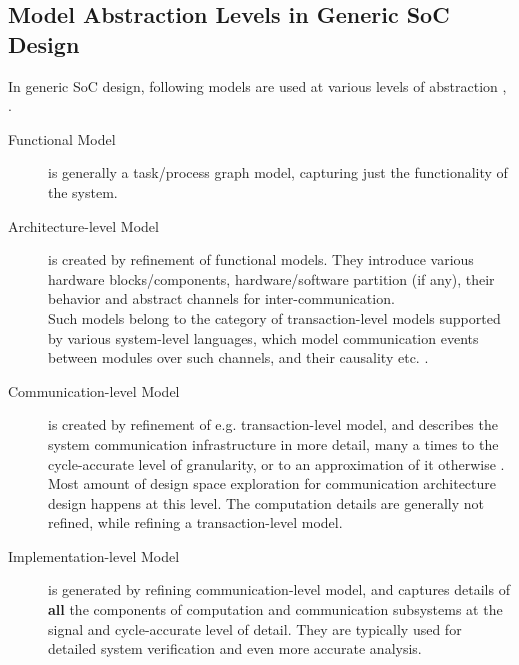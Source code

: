 \documentclass[12pt]{article}
\begin{document}
\subsection{Model Abstraction Levels in Generic SoC Design}
In generic SoC design, following models are used at various levels of
abstraction \cite{ocn_book}, \cite{comm_soc}.
\begin{description}
\item[Functional Model] is generally a task/process graph model, capturing
just the functionality of the system. 
\item[Architecture-level Model] is created by refinement of functional
models. They introduce various hardware blocks/components,
hardware/software partition (if any), their behavior and abstract channels
for inter-communication. \\
Such models belong to the category of
transaction-level models supported by various system-level
languages, which model communication events between modules over such
channels, and their causality etc. \cite{gajski_tlm_pap}.
\item[Communication-level Model] is created by refinement of e.g.
transaction-level model, and describes the system communication
infrastructure in more detail, many a times to the
cycle-accurate level of granularity, or to an approximation of
it otherwise \cite{gajski_tlm_pap}.
Most amount of design space exploration for communication architecture
design happens at this level. The computation details are generally not
refined, while refining a transaction-level model.
\item[Implementation-level Model] is generated by refining
communication-level model, and captures details of \textbf{all} the
components of computation and communication subsystems at the signal and
cycle-accurate level of detail. They are typically used for
detailed system verification and even more accurate analysis.
\end{description}
\end{document}
